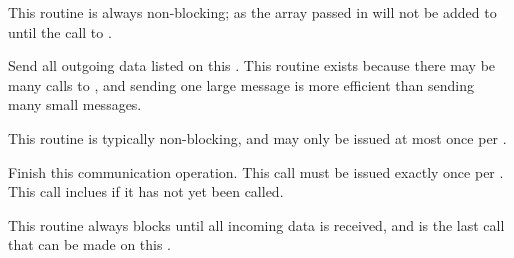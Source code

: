 This routine is always non-blocking; as the  array passed in
will not be added to until the call to .



Send all outgoing data listed on this .  This routine exists because there may be many calls to , and sending one large message is more efficient than sending many small messages.

This routine is typically non-blocking, and may only be issued at most once per .



Finish this communication operation. This call must be issued exactly once per .  This call inclues  if it has not yet been called.

This routine always blocks until all incoming data is received, and is the last call that can be made on this .

